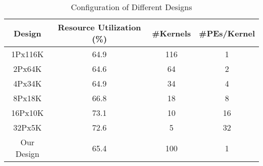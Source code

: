 \begin{table} [!hbp]
\centering

\caption{Configuration of Different Designs}
\label{tab:configuration}
\begin{tabular}
{|c|c|c|c|} \hline \hline
{Design}&{Resource Utilization (\%)}&{\#Kernels}&{\#PEs/Kernel}\\
\hline
{1Px116K}&{64.9}&{116}&{1}\\
{2Px64K}&{64.6}&{64}&{2}\\
{4Px34K}&{64.9}&{34}&{4}\\
{8Px18K}&{66.8}&{18}&{8}\\
{16Px10K}&{73.1}&{10}&{16}\\
{32Px5K}&{72.6}&{5}&{32}\\
{Our Design}&{65.4}&{100}&{1}\\
\hline
\end{tabular}
\end{table}

